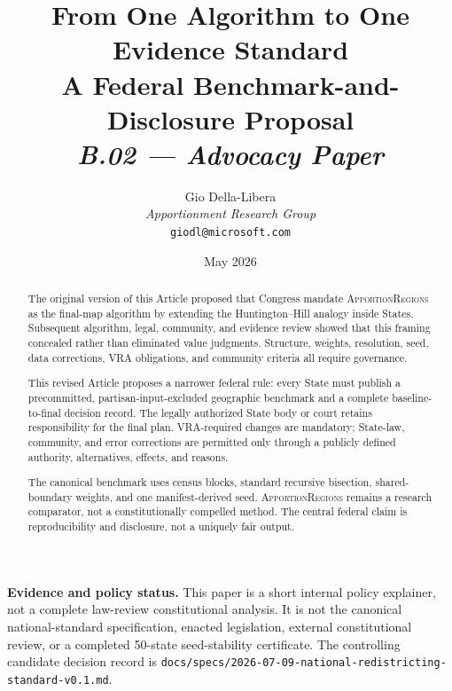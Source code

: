 \documentclass[12pt]{article}
\title{%
  \textbf{From One Algorithm to One Evidence Standard}\\[0.4em]
  \large A Federal Benchmark-and-Disclosure Proposal\\[0.8em]
  \normalsize\textit{B.02 --- Advocacy Paper}%
}
\author{%
  Gio Della-Libera\\
  \textit{Apportionment Research Group}\\
  \small\texttt{giodl@microsoft.com}
}
\date{May 2026}
\newcommand{\ar}{\textsc{ApportionRegions}}
\begin{document}
\maketitle

\begin{abstract}
\noindent
The original version of this Article proposed that Congress mandate
\ar{} as the final-map algorithm by extending the Huntington--Hill analogy
inside States. Subsequent algorithm, legal, community, and evidence review
showed that this framing concealed rather than eliminated value judgments.
Structure, weights, resolution, seed, data corrections, VRA obligations, and
community criteria all require governance.

This revised Article proposes a narrower federal rule: every State must publish
a precommitted, partisan-input-excluded geographic benchmark and a complete
baseline-to-final decision record. The legally authorized State body or court
retains responsibility for the final plan. VRA-required changes are mandatory;
State-law, community, and error corrections are permitted only through a
publicly defined authority, alternatives, effects, and reasons.

The canonical benchmark uses census blocks, standard recursive bisection,
shared-boundary weights, and one manifest-derived seed. \ar{} remains a
research comparator, not a constitutionally compelled method. The central
federal claim is reproducibility and disclosure, not a uniquely fair output.
\end{abstract}

\noindent\textbf{Evidence and policy status.} This paper is a short internal
policy explainer, not a complete law-review constitutional analysis. It is not
the canonical national-standard
specification, enacted legislation, external constitutional review, or a
completed 50-state seed-stability certificate. The controlling candidate
decision record is
\texttt{docs/specs/2026-07-09-national-redistricting-standard-v0.1.md}.

\tableofcontents
\newpage





\end{document}
